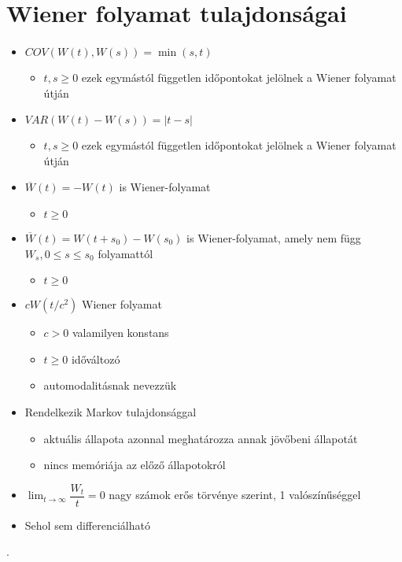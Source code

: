 \documentclass[11pt,a4paper]{article}
\begin{document}
			\section{Wiener folyamat tulajdonságai}
				\paragraph{}
					\begin{itemize}
						  \item $COV(W(t), W(s)) = \min(s,t)$
						  \begin{itemize}
						   	\item $t,s \ge 0$ ezek egymástól független időpontokat jelölnek a Wiener folyamat útján
						  \end{itemize}
						  \item $VAR(W(t)-W(s))=|t-s|$
						  \begin{itemize}
						  	\item $t,s \ge 0$ ezek egymástól független időpontokat jelölnek a Wiener folyamat útján
						  \end{itemize}
						  \item $\overline{W}(t) = -W(t)$ is Wiener-folyamat
						  \begin{itemize}
						  	\item $t \ge 0$
						  \end{itemize}
						  \item $\overline{W}(t) = W(t+s_0) - W(s_0)$ is Wiener-folyamat, amely nem függ $W_s, 0 \le s \le s_0$ folyamattól
						  \begin{itemize}
						  	\item $t \ge 0$
						  \end{itemize}
						  \item $cW(t/c^2)$ Wiener folyamat
						  \begin{itemize}
						  	\item $c > 0$ valamilyen konstans
						  	\item $t \ge 0$ időváltozó
						  	\item automodalitásnak nevezzük
						  \end{itemize}
						  \item Rendelkezik Markov tulajdonsággal
						  \begin{itemize}
						 	  \item aktuális állapota azonnal meghatározza annak jövőbeni állapotát
						  	 \item nincs memóriája az előző állapotokról
						  \end{itemize}
						\item $\lim_{t \to \infty} \dfrac{W_t}{t}=0$ nagy számok erős törvénye szerint, 1 valószínűséggel
						\item Sehol sem differenciálható
					\end{itemize}.
\end{document}
